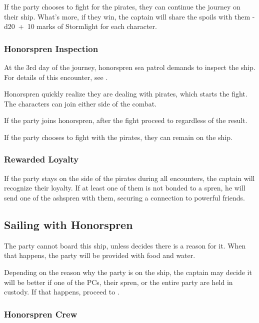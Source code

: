 If the party chooses to fight for the pirates, they can continue the journey on their ship. What's more, if they win, the captain will share the spoils with them - d20~+~10 marks of Stormlight for each character.

\subsubsection{Honorspren Inspection}

At the 3rd day of the journey, honorspren sea patrol demands to inspect the ship. For details of this encounter, see .

Honorspren quickly realize they are dealing with pirates, which starts the fight. The characters can join either side of the combat.

If the party joins honorspren, after the fight proceed to  regardless of the result.

If the party chooses to fight with the pirates, they can remain on the ship.

\subsubsection{Rewarded Loyalty}

If the party stays on the side of the pirates during all encounters, the captain will recognize their loyalty. If at least one of them is not bonded to a spren, he will send one of the ashspren with them, securing a connection to powerful friends.



\subsection{Sailing with Honorspren}
\label{ssec:sailingHonorspren}

The party cannot board this ship, unless \npcHonorsprenCaptain{} decides there is a reason for it. When that happens, the party will be provided with food and water.

Depending on the reason why the party is on the ship, the captain may decide it will be better if one of the PCs, their spren, or the entire party are held in custody. If that happens, proceed to .

\subsubsection{Honorspren Crew}

